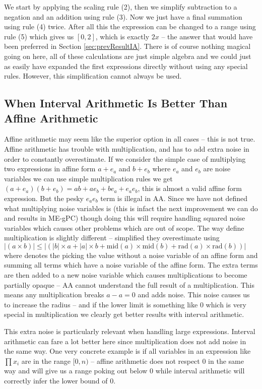 We start by applying the scaling rule (2), then we simplify subtraction to a negation and an addition using rule (3). Now we just have a final summation using rule (4) twice. After all this the expression can be changed to a range using rule (5) which gives us $[0, 2]$, which is exactly $2x$ -- the answer that would have been preferred in Section \ref{sec:prevResultIA}. There is of course nothing magical going on here, all of these calculations are just simple algebra and we could just as easily have expanded the first expressions directly without using any special rules. However, this simplification cannot always be used. 

\subsection{When Interval Arithmetic Is Better Than Affine Arithmetic}
Affine arithmetic may seem like the superior option in all cases -- this is not true. Affine arithmetic has trouble with multiplication, and has to add extra noise in order to constantly overestimate. If we consider the simple case of multiplying two expressions in affine form $a + e_a$ and $b + e_b$ where $e_a$ and $e_b$ are noise variables we can use simple multiplication rules we get $(a + e_a)(b + e_b) = ab + ae_b + be_a + e_ae_b$, this is almost a valid affine form expression. But the pesky $e_ae_b$ term is illegal in AA. Since we have not defined what multiplying noise variables is (this is infact the next improvement we can do and results in  ME-gPC) though doing this will require handling squared noise variables which causes other problems which are out of scope. The way \cite{src:affAri} define multiplication is slightly different -- simplified they overestimate using $|(a \times b)| \leq |(|b| \times a + |a| \times b + \text{mid}(a) \times \text{mid}(b) + \text{rad}(a) \times \text{rad}(b))|$ where  denotes the picking the value without a noise variable of an affine form and  summing all terms which have a noise variable of the affine form. The extra terms are then added to a new noise variable which causes multiplications to become partially opaque -- AA cannot understand the full result of a multiplication. This means any multiplication breaks $a - a = 0$ and adds noise. This noise causes us to increase the radius -- and if the lower limit is something like $0$ which is very special in multiplication we clearly get better results with interval arithmetic.

This extra noise is particularly relevant when handling large expressions. Interval arithmetic can fare a lot better here since multiplication does not add noise in the same way. One very concrete example is if all variables in an expression like $\prod x_i$ are in the range $[0,n)$ -- affine arithmetic does not respect $0$ in the same way and will give us a range poking out below $0$ while interval arithmetic will correctly infer the lower bound of $0$.

